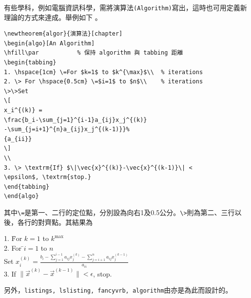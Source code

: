 有些學科，例如電腦資訊科學，需將演算法{\tt(Algorithm)}寫出，這時也可用定義新理論的方式來達成。舉例如下
。
\begin{Verbatim}[frame=single,firstline=1,label={An algorithm}]
\newtheorem{algor}{演算法}[chapter]
\begin{algo}[An Algorithm]
\hfill\par           % 保持 algorithm 與 tabbing 距離
\begin{tabbing}
1. \hspace{1cm} \=For $k=1$ to $k^{\max}$\\  % iterations
2. \> For \hspace{0.5cm} \=$i=1$ to $n$\\    % iterations
\>\>Set
\[
x_i^{(k)} =
\frac{b_i-\sum_{j=1}^{i-1}a_{ij}x_j^{(k)}
-\sum_{j=i+1}^{n}a_{ij}x_j^{(k-1)}}%
{a_{ii}}
\]
\\
3. \> \textrm{If} $\|\vec{x}^{(k)}-\vec{x}^{(k-1)}\| < 
\epsilon$, \textrm{stop.}
\end{tabbing}
\end{algo}
\end{Verbatim}
其中\verb+\=+是第一、二行的定位點，分別設為向右1及0.5公分。\verb+\>+則為第二、三行以後，各行的對齊點。其結果為 
\begin{algo}[An Algorithm]
\hfill\par   %
\begin{tabbing}
1. \hspace{1cm} \=For $k=1$ to $k^{\max}$ \\   
2. \> For \hspace{0.5cm}\=$i=1$ to $n$\\   
\>\> Set
$
x_i^{(k)} =
\frac{b_i-\sum_{j=1}^{i-1}a_{ij}x_j^{(k)}
-\sum_{j=i+1}^{n}a_{ij}x_j^{(k-1)}} {a_{ii}}
$\\
3. \>\textrm{If} $\|\vec{x}^{(k)}-\vec{x}^{(k-1)}\| < \epsilon$, \textrm{stop.}
\end{tabbing}
\end{algo}
另外，{\tt listings, lslisting, fancyvrb, algorithm}由亦是為此而設計的。
